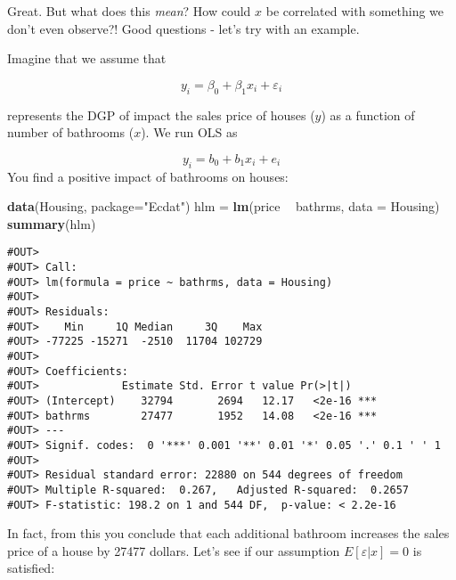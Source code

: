 \documentclass[]{book}
\newenvironment{Shaded}{\begin{snugshade}}{\end{snugshade}}
\newcommand{\KeywordTok}[1]{\textcolor[rgb]{0.13,0.29,0.53}{\textbf{#1}}}
\newcommand{\DataTypeTok}[1]{\textcolor[rgb]{0.13,0.29,0.53}{#1}}
\newcommand{\StringTok}[1]{\textcolor[rgb]{0.31,0.60,0.02}{#1}}
\newcommand{\CommentTok}[1]{\textcolor[rgb]{0.56,0.35,0.01}{\textit{#1}}}
\newcommand{\OperatorTok}[1]{\textcolor[rgb]{0.81,0.36,0.00}{\textbf{#1}}}
\newcommand{\NormalTok}[1]{#1}
\begin{document}
 Great. But what does this \emph{mean}? How could \(x\) be correlated
with something we don't even observe?! Good questions - let's try with
an example.

Imagine that we assume that

\begin{equation}
y_i = \beta_0 + \beta_1 x_i + \varepsilon_i \label{eq:DGP-h}
\end{equation}

represents the DGP of impact the sales price of houses (\(y\)) as a
function of number of bathrooms (\(x\)). We run OLS as

\[
y_i = b_0 + b_1 x_i + e_i 
\] You find a positive impact of bathrooms on houses:

\begin{Shaded}
\begin{Highlighting}[]
\KeywordTok{data}\NormalTok{(Housing, }\DataTypeTok{package=}\StringTok{"Ecdat"}\NormalTok{)}
\NormalTok{hlm =}\StringTok{ }\KeywordTok{lm}\NormalTok{(price }\OperatorTok{~}\StringTok{ }\NormalTok{bathrms, }\DataTypeTok{data =}\NormalTok{ Housing)}
\KeywordTok{summary}\NormalTok{(hlm)}
\end{Highlighting}
\end{Shaded}

\begin{verbatim}
#OUT> 
#OUT> Call:
#OUT> lm(formula = price ~ bathrms, data = Housing)
#OUT> 
#OUT> Residuals:
#OUT>    Min     1Q Median     3Q    Max 
#OUT> -77225 -15271  -2510  11704 102729 
#OUT> 
#OUT> Coefficients:
#OUT>             Estimate Std. Error t value Pr(>|t|)    
#OUT> (Intercept)    32794       2694   12.17   <2e-16 ***
#OUT> bathrms        27477       1952   14.08   <2e-16 ***
#OUT> ---
#OUT> Signif. codes:  0 '***' 0.001 '**' 0.01 '*' 0.05 '.' 0.1 ' ' 1
#OUT> 
#OUT> Residual standard error: 22880 on 544 degrees of freedom
#OUT> Multiple R-squared:  0.267,   Adjusted R-squared:  0.2657 
#OUT> F-statistic: 198.2 on 1 and 544 DF,  p-value: < 2.2e-16
\end{verbatim}

In fact, from this you conclude that each additional bathroom increases
the sales price of a house by 27477 dollars. Let's see if our assumption
\(E[\varepsilon|x] = 0\) is satisfied:

\begin{Shaded}
\end{Shaded}
\end{document}
